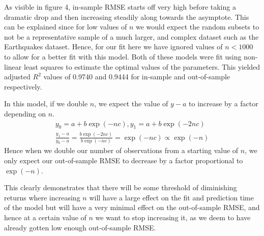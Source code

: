 \documentclass[10pt]{article}
\begin{document}
As visible in figure 4, in-sample RMSE starts off very high before taking a dramatic drop and then increasing steadily along towards the asymptote. This can be explained since for low values of $n$ we would expect the random subsets to not be a representative sample of a much larger, and complex dataset such as the Earthquakes dataset. Hence, for our fit here we have ignored values of $n<1000$ to allow for a better fit with this model. Both of these models were fit using non-linear least squares to estimate the optimal values of the parameters. This yielded adjusted $R^2$ values of 0.9740 and 0.9444 for in-sample and out-of-sample respectively.

In this model, if we double $n$, we expect the value of $y-a$ to increase by a factor depending on $n$.
\begin{align}
y_0 = a+b\exp(-nc), y_1=a+b\exp(-2nc)\\
\frac{y_1 - a}{y_0 - a} = \frac{b\exp(-2nc)}{b\exp(-nc)}=\exp(-nc)\propto \exp(-n)
\end{align}
Hence when we double our number of observations from a starting value of $n$, we only expect our out-of-sample RMSE to decrease by a factor proportional to $\exp(-n)$.

This clearly demonstrates that there will be some threshold of diminishing returns where increasing $n$ will have a large effect on the fit and prediction time of the model but will have a very minimal effect on the out-of-sample RMSE, and hence at a certain value of $n$ we want to stop increasing it, as we deem to have already gotten low enough out-of-sample RMSE.
\end{document}
